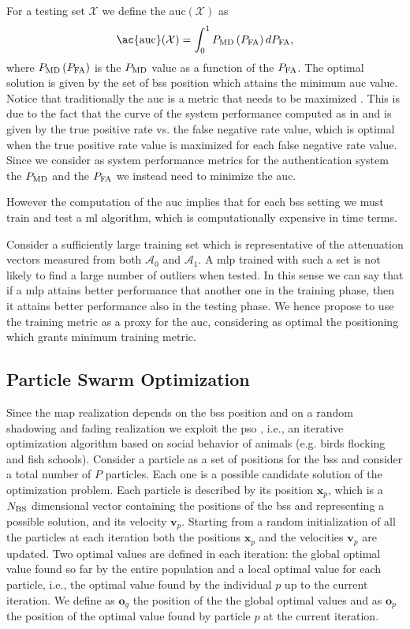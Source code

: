 \documentclass[twocolumns]{IEEEtran}
\begin{document}
For a testing set $\mathcal{X}$ we define the \ac{auc}$(\mathcal{X})$ as
\begin{equation}
    \text{\ac{auc}}(\mathcal{X}) = \int_{0}^{1} P_{\rm MD}\left(P_{\rm FA}\right) d P_{\rm FA},
\end{equation}
where $P_{\rm MD}\left(P_{\rm FA}\right)$ is the $P_{\rm MD}$ value as a function of the $P_{\rm FA}$.
The optimal solution is given by the set of \acp{bs} position which attains the minimum \ac{auc} value. Notice that traditionally the \ac{auc} is a metric that needs to be maximized \cite{hanley-82}. This is due to the fact that the curve of the system performance computed as in \cite{hanley-82} and \cite{Kennedy-11} is given by the true positive rate vs. the false negative rate value, which is optimal when the true positive rate value is maximized for each false negative rate value. Since we consider as system performance metrics for the authentication system the $P_{\rm MD}$ and the $P_{\rm FA}$ we instead need to minimize the \ac{auc}. 

However the computation of the \ac{auc} implies that for each \acp{bs} setting we must train and test a \ac{ml} algorithm, which is computationally expensive in time terms. 

Consider a sufficiently large training set which is representative of the attenuation vectors measured from both $\mathcal{A}_0$ and $\mathcal{A}_1$. A \ac{mlp} trained with such a set is not likely to find a large number of outliers when tested. In this sense we can say that if a \ac{mlp} attains better performance that another one in the training phase, then it attains better performance also in the testing phase. We hence propose to use the training metric as a proxy for the \ac{auc}, considering as optimal the positioning which grants minimum training metric.

\subsection{Particle Swarm Optimization}

Since the map realization depends on the \acp{bs} position and on a random shadowing and fading realization we exploit the \ac{pso} \cite{Kennedy-11}, i.e., an iterative optimization algorithm based on social behavior of animals (e.g. birds flocking and fish schools). Consider a particle as a set of positions for the \acp{bs} and consider a total number of $P$ particles. Each one is a possible candidate solution of the optimization problem. Each particle is described by its position $\bm{x}_p$, which is a $N_{\rm BS}$ dimensional vector containing the positions of the \acp{bs} and representing a possible solution, and its velocity $\bm{v}_p$.
Starting from a random initialization of all the particles at each iteration both the positions $\bm{x}_p$ and the velocities $\bm{v}_p$ are updated. Two optimal values are defined in each iteration: the global optimal value found so far by the entire population and a local optimal value for each particle, i.e., the optimal value found by the individual $p$ up to the current iteration. We define as $\bm{o}_g$ the position of the the global optimal values and as $\bm{o}_p$ the position of the optimal value found by particle $p$ at the current iteration.
\end{document}

